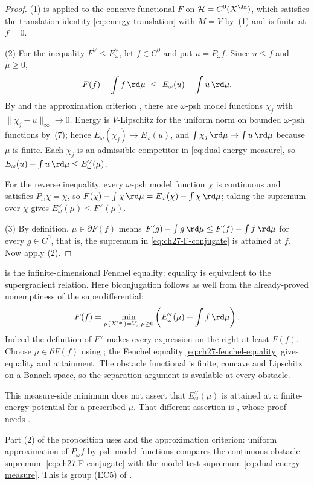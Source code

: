 \begin{proof}
(1) is  applied to the concave functional $F$ on
$\mathcal H=C^0(X^{\An})$, which satisfies the translation identity
\eqref{eq:energy-translation} with $M=V$ by
\,(1) and is finite at $f=0$.

(2) For the inequality $F^\vee\leq E^\vee_\omega$, let $f\in C^0$ and put
$u=P_\omega f$.  Since $u\leq f$ and $\mu\geq0$,
\[
 F(f)-\int f\,\rd\mu\ \leq\ E_\omega(u)-\int u\,\rd\mu .
\]
By  and the approximation criterion
, there are $\omega$-psh model
functions $\chi_j$ with $\lVert\chi_j-u\rVert_\infty\to0$.  Energy is
$V$-Lipschitz for the uniform norm on bounded $\omega$-psh functions by
\,(7); hence
$E_\omega(\chi_j)\to E_\omega(u)$, and
$\int\chi_j\,\rd\mu\to\int u\,\rd\mu$ because $\mu$ is finite.  Each
$\chi_j$ is an admissible competitor in \eqref{eq:dual-energy-measure}, so
$E_\omega(u)-\int u\,\rd\mu\leq E^\vee_\omega(\mu)$.

For the reverse inequality, every $\omega$-psh model function $\chi$ is
continuous and satisfies $P_\omega\chi=\chi$, so
$F(\chi)-\int\chi\,\rd\mu=E_\omega(\chi)-\int\chi\,\rd\mu$; taking the
supremum over $\chi$ gives $E^\vee_\omega(\mu)\leq F^\vee(\mu)$.

(3) By definition, $\mu\in\partial F(f)$ means
$F(g)-\int g\,\rd\mu\leq F(f)-\int f\,\rd\mu$ for every $g\in C^0$, that
is, the supremum in \eqref{eq:ch27-F-conjugate} is attained at $f$.  Now
apply (2).
\end{proof}

\begin{remark}
\label{rem:ch27-legendre-picture}
 is the infinite-dimensional
Fenchel equality: equality is equivalent to the supergradient relation.
Here biconjugation follows as well from the already-proved nonemptiness
of the superdifferential:
\[
 F(f)=\min_{\mu(X^{\An})=V,\ \mu\geq0}
        \left(E_\omega^\vee(\mu)+\int f\,\rd\mu\right).
\]
Indeed the definition of $F^\vee$ makes every expression on the right at
least $F(f)$.  Choose $\mu\in\partial F(f)$ using
; the Fenchel equality
\eqref{eq:ch27-fenchel-equality} gives equality and attainment.
The obstacle functional is finite, concave and Lipschitz on a Banach space,
so the separation argument is available at every obstacle.

This measure-side minimum does not assert that $E_\omega^\vee(\mu)$
is attained at a finite-energy potential for a prescribed $\mu$.
That different assertion is
, whose proof needs
.

Part (2) of the proposition uses
 and the approximation criterion:
uniform approximation of $P_\omega f$ by psh model functions compares
the continuous-obstacle supremum \eqref{eq:ch27-F-conjugate} with the
model-test supremum \eqref{eq:dual-energy-measure}.
This is group \textup{(EC5)} of .
\end{remark}

